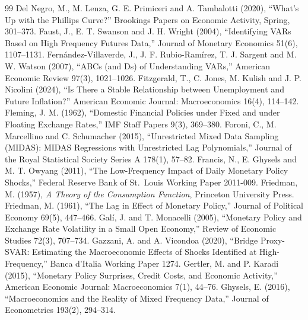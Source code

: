 \documentclass[11pt]{article}
\begin{document}
\begin{thebibliography}{99}
 Del Negro, M., M. Lenza, G. E. Primiceri and A. Tambalotti (2020), ``What's Up with the Phillips Curve?'' Brookings Papers on Economic Activity, Spring, 301--373.
 Faust, J., E. T. Swanson and J. H. Wright (2004), ``Identifying VARs Based on High Frequency Futures Data,'' Journal of Monetary Economics 51(6), 1107--1131.
 Fern\'andez-Villaverde, J., J. F. Rubio-Ram\'irez, T. J. Sargent and M. W. Watson (2007), ``ABCs (and Ds) of Understanding VARs,'' American Economic Review 97(3), 1021--1026.
 Fitzgerald, T., C. Jones, M. Kulish and J. P. Nicolini (2024), ``Is There a Stable Relationship between Unemployment and Future Inflation?'' American Economic Journal: Macroeconomics 16(4), 114--142.
 Fleming, J. M. (1962), ``Domestic Financial Policies under Fixed and under Floating Exchange Rates,'' IMF Staff Papers 9(3), 369--380.
 Foroni, C., M. Marcellino and C. Schumacher (2015), ``Unrestricted Mixed Data Sampling (MIDAS): MIDAS Regressions with Unrestricted Lag Polynomials,'' Journal of the Royal Statistical Society Series A 178(1), 57--82.
 Francis, N., E. Ghysels and M. T. Owyang (2011), ``The Low-Frequency Impact of Daily Monetary Policy Shocks,'' Federal Reserve Bank of St.\ Louis Working Paper 2011-009.
 Friedman, M. (1957), \emph{A Theory of the Consumption Function}, Princeton University Press.
 Friedman, M. (1961), ``The Lag in Effect of Monetary Policy,'' Journal of Political Economy 69(5), 447--466.
 Gal\'i, J. and T. Monacelli (2005), ``Monetary Policy and Exchange Rate Volatility in a Small Open Economy,'' Review of Economic Studies 72(3), 707--734.
 Gazzani, A. and A. Vicondoa (2020), ``Bridge Proxy-SVAR: Estimating the Macroeconomic Effects of Shocks Identified at High-Frequency,'' Banca d'Italia Working Paper 1274.
 Gertler, M. and P. Karadi (2015), ``Monetary Policy Surprises, Credit Costs, and Economic Activity,'' American Economic Journal: Macroeconomics 7(1), 44--76.
 Ghysels, E. (2016), ``Macroeconomics and the Reality of Mixed Frequency Data,'' Journal of Econometrics 193(2), 294--314.

\end{thebibliography}
\end{document}
